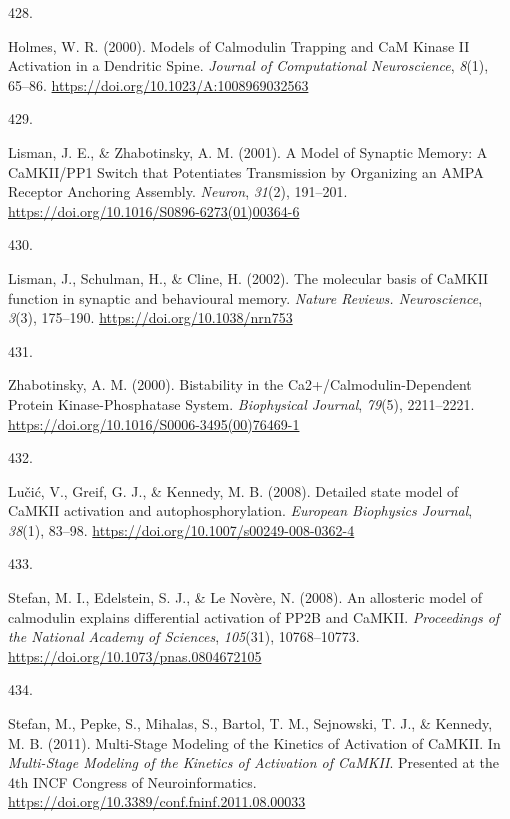 \documentclass[
  11pt,
  letterpaper,
]{scrreprt}
\newlength{\cslhangindent}
\newlength{\csllabelwidth}
\newenvironment{CSLReferences}[2] %
 {\begin{list}{}{%
  \setlength{\itemindent}{0pt}
  \setlength{\leftmargin}{0pt}
  \setlength{\parsep}{0pt}
  \ifodd #1
   \setlength{\leftmargin}{\cslhangindent}
   \setlength{\itemindent}{-1\cslhangindent}
  \fi
  \setlength{\itemsep}{#2\baselineskip}}}
 {\end{list}}
\newcommand{\CSLLeftMargin}[1]{\parbox[t]{\csllabelwidth}{\strut#1\strut}}
\newcommand{\CSLRightInline}[1]{\parbox[t]{\linewidth - \csllabelwidth}{\strut#1\strut}}
\begin{document}
\begin{CSLReferences}{0}{0}
\CSLLeftMargin{428. }%
\CSLRightInline{Holmes, W. R. (2000). Models of {Calmodulin Trapping}
and {CaM Kinase II Activation} in a {Dendritic Spine}. \emph{Journal of
Computational Neuroscience}, \emph{8}(1), 65--86.
\url{https://doi.org/10.1023/A:1008969032563}}

\CSLLeftMargin{429. }%
\CSLRightInline{Lisman, J. E., \& Zhabotinsky, A. M. (2001). A {Model}
of {Synaptic Memory}: {A CaMKII}/{PP1 Switch} that {Potentiates
Transmission} by {Organizing} an {AMPA Receptor Anchoring Assembly}.
\emph{Neuron}, \emph{31}(2), 191--201.
\url{https://doi.org/10.1016/S0896-6273(01)00364-6}}

\CSLLeftMargin{430. }%
\CSLRightInline{Lisman, J., Schulman, H., \& Cline, H. (2002). The
molecular basis of {CaMKII} function in synaptic and behavioural memory.
\emph{Nature Reviews. Neuroscience}, \emph{3}(3), 175--190.
\url{https://doi.org/10.1038/nrn753}}

\CSLLeftMargin{431. }%
\CSLRightInline{Zhabotinsky, A. M. (2000). Bistability in the
{Ca2}+/{Calmodulin-Dependent Protein Kinase-Phosphatase System}.
\emph{Biophysical Journal}, \emph{79}(5), 2211--2221.
\url{https://doi.org/10.1016/S0006-3495(00)76469-1}}

\CSLLeftMargin{432. }%
\CSLRightInline{Lučić, V., Greif, G. J., \& Kennedy, M. B. (2008).
Detailed state model of {CaMKII} activation and autophosphorylation.
\emph{European Biophysics Journal}, \emph{38}(1), 83--98.
\url{https://doi.org/10.1007/s00249-008-0362-4}}

\CSLLeftMargin{433. }%
\CSLRightInline{Stefan, M. I., Edelstein, S. J., \& Le Novère, N.
(2008). An allosteric model of calmodulin explains differential
activation of {PP2B} and {CaMKII}. \emph{Proceedings of the National
Academy of Sciences}, \emph{105}(31), 10768--10773.
\url{https://doi.org/10.1073/pnas.0804672105}}

\CSLLeftMargin{434. }%
\CSLRightInline{Stefan, M., Pepke, S., Mihalas, S., Bartol, T. M.,
Sejnowski, T. J., \& Kennedy, M. B. (2011). Multi-{Stage Modeling} of
the {Kinetics} of {Activation} of {CaMKII}. In \emph{Multi-{Stage
Modeling} of the {Kinetics} of {Activation} of {CaMKII}}. Presented at
the 4th {INCF Congress} of {Neuroinformatics}.
\url{https://doi.org/10.3389/conf.fninf.2011.08.00033}}


\end{CSLReferences}
\end{document}
